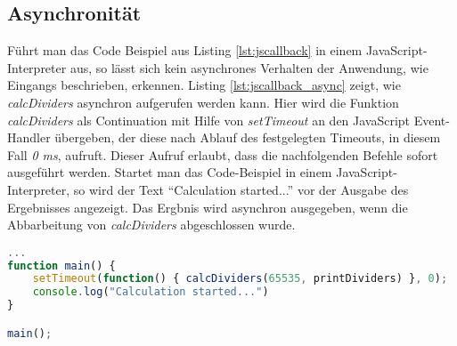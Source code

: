\subsection*{Asynchronität}
Führt man das Code Beispiel aus Listing \ref{lst:jscallback} in einem JavaScript-Interpreter aus, so lässt sich kein asynchrones Verhalten der Anwendung, wie Eingangs beschrieben, erkennen. Listing \ref{lst:jscallback_async} zeigt, wie \textit{calcDividers} asynchron aufgerufen werden kann. Hier wird die Funktion \mbox{\textit{calcDividers}} als Continuation mit Hilfe von \textit{setTimeout} an den JavaScript Event-Handler übergeben, der diese nach Ablauf des festgelegten Timeouts, in diesem Fall \textit{0 ms}, aufruft. Dieser Aufruf erlaubt, dass die nachfolgenden Befehle sofort ausgeführt werden. Startet man das Code-Beispiel in einem JavaScript-Interpreter, so wird der Text ``Calculation started...'' vor der Ausgabe des Ergebnisses angezeigt. Das Ergbnis wird asynchron ausgegeben, wenn die Abbarbeitung von \textit{calcDividers} abgeschlossen wurde.
\begin{lstlisting}[language=JavaScript,caption=JavaScript setTimeout Beispiel,label=lst:jscallback_async]
...
function main() {
	setTimeout(function() { calcDividers(65535, printDividers) }, 0);
	console.log("Calculation started...")
}

main();
\end{lstlisting}
\acresetall
